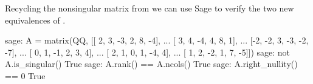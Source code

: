 Recycling the nonsingular matrix from  we can use Sage to verify the two new equivalences of .
%
\begin{sageexample}
sage: A = matrix(QQ, [[ 2,  3, -3,  2,  8, -4],
...                   [ 3,  4, -4,  4,  8,  1],
...                   [-2, -2,  3, -3, -2, -7],
...                   [ 0,  1, -1,  2,  3,  4],
...                   [ 2,  1,  0,  1, -4,  4],
...                   [ 1,  2, -2,  1,  7, -5]])
sage: not A.is_singular()
True
sage: A.rank() == A.ncols()
True
sage: A.right_nullity() == 0
True
\end{sageexample}
%
\begin{sageverbatim}
\end{sageverbatim}
%
